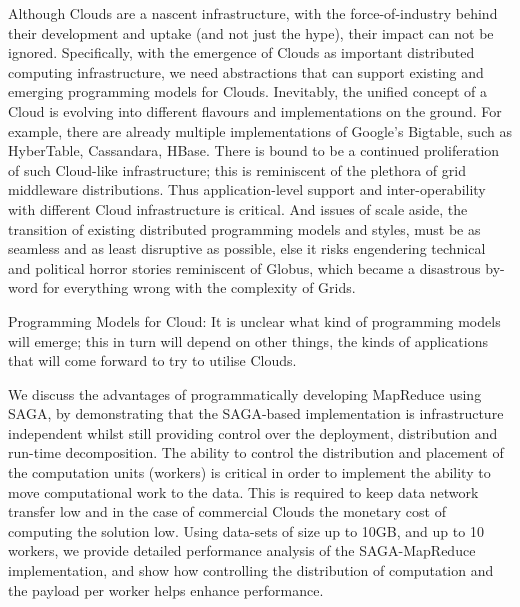 \documentclass[conference,final]{IEEEtran}
\begin{document}
Although Clouds are a nascent infrastructure, with the
force-of-industry behind their development and uptake (and not just
the hype), their impact can not be ignored.  Specifically, with the
emergence of Clouds as important distributed computing infrastructure,
we need abstractions that can support existing and emerging
programming models for Clouds. Inevitably, the unified concept of a
Cloud is evolving into different flavours and implementations on the
ground. For example, there are already multiple implementations of
Google's Bigtable, such as HyberTable, Cassandara, HBase. There is
bound to be a continued proliferation of such Cloud-like
infrastructure; this is reminiscent of the plethora of grid middleware
distributions. Thus application-level support and inter-operability
with different Cloud infrastructure is critical. And issues of scale
aside, the transition of existing distributed programming models and
styles, must be as seamless and as least disruptive as possible, else
it risks engendering technical and political horror stories
reminiscent of Globus, which became a disastrous by-word for
everything wrong with the complexity of Grids.

Programming Models for Cloud: It is unclear what kind of programming
models will emerge; this in turn will depend on other things, the
kinds of applications that will come forward to try to utilise Clouds.

We discuss the advantages of programmatically developing MapReduce
using SAGA, by demonstrating that the SAGA-based implementation is
infrastructure independent whilst still providing control over the
deployment, distribution and run-time decomposition.  The ability to
control the distribution and placement of the computation units
(workers) is critical in order to implement the ability to move
computational work to the data. This is required to keep data network
transfer low and in the case of commercial Clouds the monetary cost of
computing the solution low. Using data-sets of size up to 10GB, and up
to 10 workers, we provide detailed performance analysis of the
SAGA-MapReduce implementation, and show how controlling the
distribution of computation and the payload per worker helps enhance
performance.
\end{document}
